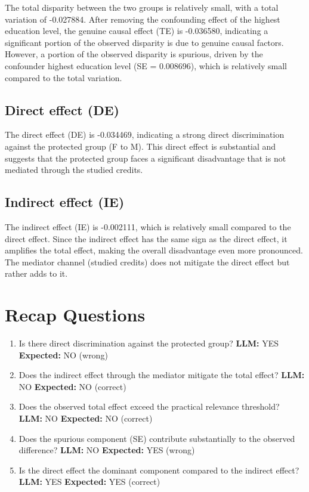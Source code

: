 \documentclass[11pt]{article}
\begin{document}
The total disparity between the two groups is relatively small, with a total variation of -0.027884. After removing the confounding effect of the highest education level, the genuine causal effect (TE) is -0.036580, indicating a significant portion of the observed disparity is due to genuine causal factors. However, a portion of the observed disparity is spurious, driven by the confounder highest education level (SE = 0.008696), which is relatively small compared to the total variation.

\subsection{Direct effect (DE)}

The direct effect (DE) is -0.034469, indicating a strong direct discrimination against the protected group (F to M). This direct effect is substantial and suggests that the protected group faces a significant disadvantage that is not mediated through the studied credits.

\subsection{Indirect effect (IE)}

The indirect effect (IE) is -0.002111, which is relatively small compared to the direct effect. Since the indirect effect has the same sign as the direct effect, it amplifies the total effect, making the overall disadvantage even more pronounced. The mediator channel (studied credits) does not mitigate the direct effect but rather adds to it.

\section{Recap Questions}

\begin{enumerate}
\item Is there direct discrimination against the protected group? \textbf{LLM:} YES \quad \textbf{Expected:} NO \quad (wrong)
\item Does the indirect effect through the mediator mitigate the total effect? \textbf{LLM:} NO \quad \textbf{Expected:} NO \quad (correct)
\item Does the observed total effect exceed the practical relevance threshold? \textbf{LLM:} NO \quad \textbf{Expected:} NO \quad (correct)
\item Does the spurious component (SE) contribute substantially to the observed difference? \textbf{LLM:} NO \quad \textbf{Expected:} YES \quad (wrong)
\item Is the direct effect the dominant component compared to the indirect effect? \textbf{LLM:} YES \quad \textbf{Expected:} YES \quad (correct)
\end{enumerate}
\end{document}

